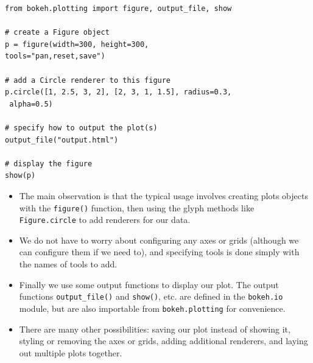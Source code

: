 \documentclass[a4paper,12pt]{article}
\begin{document}
{
	\large
\begin{framed}
\begin{verbatim}
from bokeh.plotting import figure, output_file, show

# create a Figure object
p = figure(width=300, height=300,  
tools="pan,reset,save")

# add a Circle renderer to this figure
p.circle([1, 2.5, 3, 2], [2, 3, 1, 1.5], radius=0.3,
 alpha=0.5)

# specify how to output the plot(s)
output_file("output.html")

# display the figure
show(p)
\end{verbatim}
\end{framed}
}
\newpage
\begin{itemize}
\item The main observation is that the typical usage involves creating plots objects with the \texttt{figure()} function, then using the glyph methods like \texttt{Figure.circle} to add renderers for our data. 
\item We do not have to worry about configuring any axes or grids (although we can configure them if we need to), and specifying tools is done simply with the names of tools to add. 


\item Finally we use some output functions to display our plot. The output functions \texttt{output\_file()} and \texttt{show()}, etc. are defined in the \texttt{bokeh.io} module, but are also importable from \texttt{bokeh.plotting} for convenience.


\item There are many other possibilities: saving our plot instead of showing it, styling or removing the axes or grids, adding additional renderers, and laying out multiple plots together.
\end{itemize}
 


\newpage
\end{document}
